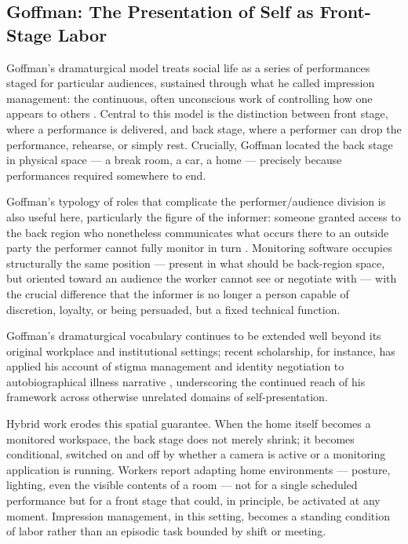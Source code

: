\documentclass[12pt, a4paper]{article}
\begin{document}
\subsection{Goffman: The Presentation of Self as Front-Stage Labor}

Goffman's dramaturgical model treats social life as a series of performances staged for particular audiences, sustained through what he called impression management: the continuous, often unconscious work of controlling how one appears to others \parencite{goffman1959presentation}. Central to this model is the distinction between front stage, where a performance is delivered, and back stage, where a performer can drop the performance, rehearse, or simply rest. Crucially, Goffman located the back stage in physical space --- a break room, a car, a home --- precisely because performances required somewhere to end.

Goffman's typology of roles that complicate the performer/audience division is also useful here, particularly the figure of the informer: someone granted access to the back region who nonetheless communicates what occurs there to an outside party the performer cannot fully monitor in turn \parencite{goffman1959presentation}. Monitoring software occupies structurally the same position --- present in what should be back-region space, but oriented toward an audience the worker cannot see or negotiate with --- with the crucial difference that the informer is no longer a person capable of discretion, loyalty, or being persuaded, but a fixed technical function.

Goffman's dramaturgical vocabulary continues to be extended well beyond its original workplace and institutional settings; recent scholarship, for instance, has applied his account of stigma management and identity negotiation to autobiographical illness narrative \parencite{almansoori2026negotiating}, underscoring the continued reach of his framework across otherwise unrelated domains of self-presentation.

Hybrid work erodes this spatial guarantee. When the home itself becomes a monitored workspace, the back stage does not merely shrink; it becomes conditional, switched on and off by whether a camera is active or a monitoring application is running. Workers report adapting home environments --- posture, lighting, even the visible contents of a room --- not for a single scheduled performance but for a front stage that could, in principle, be activated at any moment. Impression management, in this setting, becomes a standing condition of labor rather than an episodic task bounded by shift or meeting.
\end{document}
